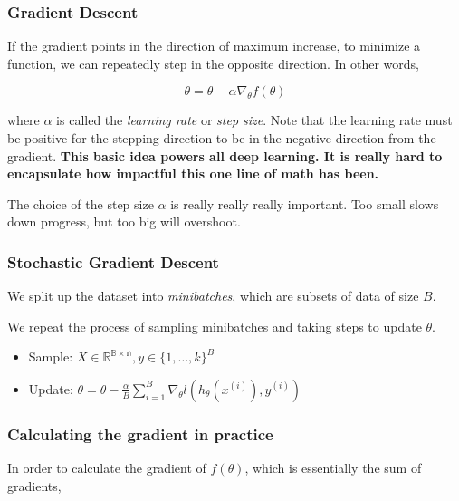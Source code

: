\documentclass[
  letterpaper,
  DIV=11,
  numbers=noendperiod]{scrreprt}
\providecommand{\tightlist}{%
  \setlength{\itemsep}{0pt}\setlength{\parskip}{0pt}}
\begin{document}
\subsubsection*{Gradient Descent}\label{gradient-descent}

If the gradient points in the direction of maximum increase, to minimize
a function, we can repeatedly step in the opposite direction. In other
words,

\[\theta = \theta - \alpha \nabla_\theta f(\theta)\]

where \(\alpha\) is called the \emph{learning rate} or \emph{step size}.
Note that the learning rate must be positive for the stepping direction
to be in the negative direction from the gradient. \textbf{This basic
idea powers all deep learning. It is really hard to encapsulate how
impactful this one line of math has been.}

The choice of the step size \(\alpha\) is really really really
important. Too small slows down progress, but too big will overshoot.

\subsubsection*{Stochastic Gradient
Descent}\label{stochastic-gradient-descent}

We split up the dataset into \emph{minibatches}, which are subsets of
data of size \(B\).

We repeat the process of sampling minibatches and taking steps to update
\(\theta\).

\begin{itemize}
\tightlist
\item
  Sample: \(X \in \mathbb{R^{B \times n}}, y \in \{ 1, \dots, k\}^B\)
\item
  Update:
  \(\theta = \theta - \frac{\alpha}{B} \sum_{i=1}^{B} \nabla_\theta l(h_\theta(x^{(i)}), y^{(i)})\)
\end{itemize}

\subsubsection*{Calculating the gradient in
practice}\label{calculating-the-gradient-in-practice}

In order to calculate the gradient of \(f(\theta)\), which is
essentially the sum of gradients,
\end{document}
